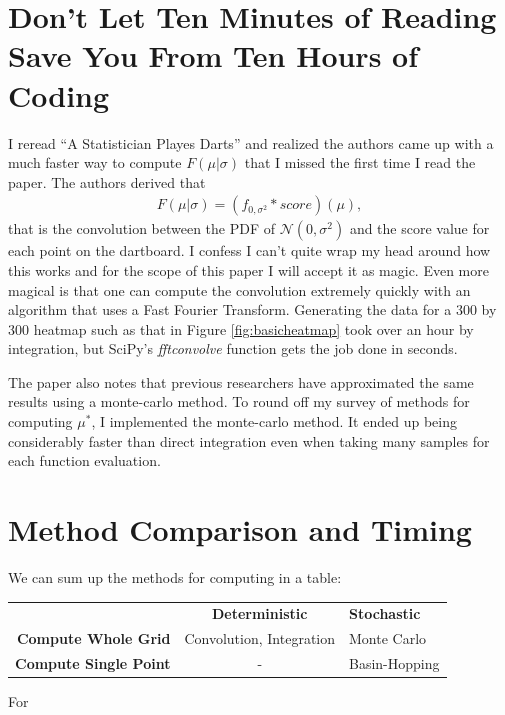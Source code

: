 \documentclass[]{article}
\newcommand{\mustar}{\ensuremath{\mu^* }}
\begin{document}
\section{Don't Let Ten Minutes of Reading Save You From Ten Hours of Coding}
I reread ``A Statistician Playes Darts''\cite{stat} and realized the authors came up with a much faster way to compute $F(\mu \vert \sigma)$ that I missed the first time I read the paper. The authors derived that
\begin{align}
	F(\mu \vert \sigma)  =(f_{0, \sigma^2} * score)(\mu),
\end{align}
that is the convolution between the PDF of $\mathcal{N}(0, \sigma^2)$ and the score value for each point on the dartboard\cite{stat}. I confess I can't quite wrap my head around how this works and for the scope of this paper I will accept it as magic. Even more magical is that one can compute the convolution extremely quickly with an algorithm that uses a Fast Fourier Transform. Generating the data for a 300 by 300 heatmap such as that in Figure \ref{fig:basicheatmap} took over an hour by integration, but SciPy's \textit{fftconvolve} function gets the job done in seconds. 

The paper \cite{stat} also notes that previous researchers have approximated the same results using a monte-carlo method. To round off my  survey of methods for computing \mustar, I implemented the monte-carlo method. It ended up being considerably faster than direct integration even when taking many samples for each function evaluation. 

\section{Method Comparison and Timing}

We can sum up the methods for computing in a table:

\begin{table}[h]
	\centering
	\begin{tabular}{r  c l}
		& \textbf{Deterministic} & \textbf{Stochastic} \\ 
		\textbf{Compute Whole Grid}& Convolution, Integration & Monte Carlo \\
		\textbf{Compute Single Point}& - & Basin-Hopping
	\end{tabular}
\end{table}

For











	

\printbibliography
\end{document}
